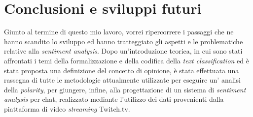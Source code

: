 \documentclass[a4paper,12pt,openright,twoside]{report}
\theoremstyle{definition}
\begin{document}

\chapter{Conclusioni e sviluppi futuri}
\label{ch:sviluppi}
Giunto al termine di questo mio lavoro, vorrei ripercorrere i passaggi 
che ne hanno scandito lo sviluppo ed hanno tratteggiato gli aspetti e le 
problematiche relative alla \emph{sentiment analysis}. Dopo un'introduzione teorica, 
in cui sono stati  affrontati i temi della formalizzazione e della codifica della 
\emph{text classification} ed è stata proposta una definizione del concetto di opinione, 
è stata effettuata una rassegna di tutte le metodologie attualmente utilizzate per eseguire un'
analisi della \emph{polarity}, per giungere, infine,  
alla progettazione di un sistema di 
\emph{sentiment analysis} per chat, 
realizzato mediante l'utilizzo dei dati provenienti dalla piattaforma di 
video \emph{streaming} Twitch.tv.
\end{document}
